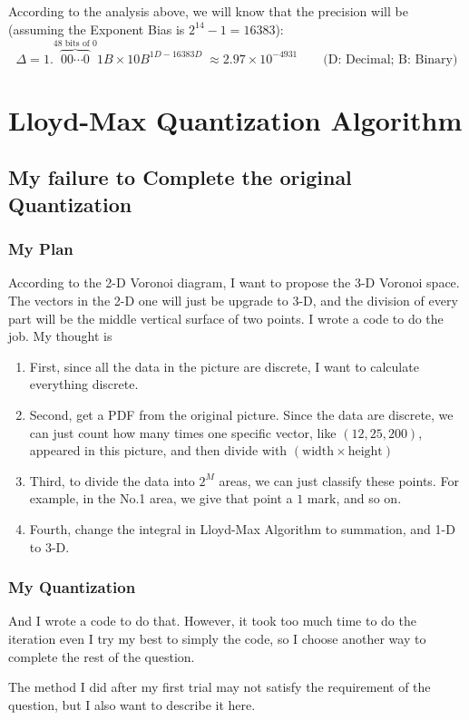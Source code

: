 \documentclass{article}
\begin{document}
According to the analysis above, we will know that the precision will be (assuming the Exponent Bias is $2^{14} - 1 = 16383$):
 $$
 \Delta = 1.\overbrace{00\cdots0}^{48 \text{ bits of } 0}1B \times 10B^{1D-16383D} \; \approx 2.97 \times 10^{-4931} \qquad \text{(D: Decimal; B: Binary)}
 $$

\section{Lloyd-Max Quantization Algorithm}
\subsection{My failure to Complete the original Quantization}
\subsubsection{My Plan}
According to the 2-D Voronoi diagram, I want to propose the 3-D Voronoi space. The vectors in the 2-D one will just be upgrade to 3-D, and the division of every part will be the middle vertical surface of two points. I wrote a code to do the job. My thought is
\begin{enumerate}
	\item First, since all the data in the picture are discrete, I want to calculate everything discrete.
	\item Second, get a PDF from the original picture. Since the data are discrete, we can just count how many times one specific vector, like $(12, 25, 200)$, appeared in this picture, and then divide with $(\mathrm{width} \times \text{height})$
	\item Third, to divide the data into $2^M$ areas, we can just classify these points. For example, in the No.1 area, we give that point a $1$ mark, and so on.
	\item Fourth, change the integral in Lloyd-Max Algorithm to summation, and 1-D to 3-D.
\end{enumerate}

\subsubsection{My Quantization}

And I wrote a code to do that. However, it took too much time to do the iteration even I try my best to simply the code, so I choose another way to complete the rest of the question.

The method I did after my first trial may not satisfy the requirement of the question, but I also want to describe it here.
\end{document}
